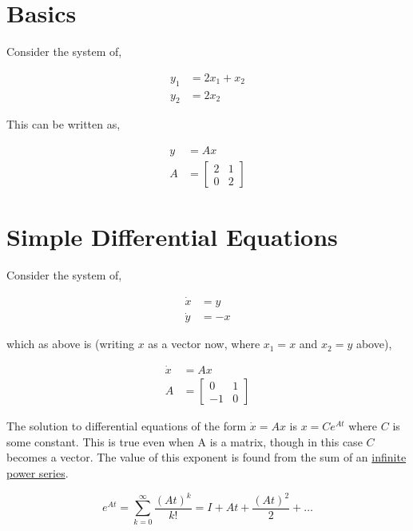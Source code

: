 \documentclass{article}
\begin{document}
\noindent{}

\section{Basics}

Consider the system of,

\begin{align}
    y_1 &= 2x_1 + x_2 \\
    y_2 &= 2x_2
\end{align}

\noindent This can be written as,

\begin{align}
    y &= Ax \\
    A &=
    \begin{bmatrix}
        2 & 1 \\
        0 & 2
    \end{bmatrix}
\end{align}

\section{Simple Differential Equations}

Consider the system of,

\begin{align}
    \dot{x} &= y \\
    \dot{y} &= -x
\end{align}

\noindent which as above is (writing $x$ as a vector now, where $x_1 = x$ and $x_2 = y$ above),

\begin{align}
    \dot{x} &= Ax \\
    A &=
    \begin{bmatrix}
        0 & 1 \\
        -1 & 0
    \end{bmatrix}
\end{align}

\noindent The solution to differential equations of the form $\dot{x} = Ax$ is $x = Ce^{At}$ where $C$ is some constant.
This is true even when A is a matrix, though in this case $C$ becomes a vector.
The value of this exponent is found from the sum of an \href{https://en.wikipedia.org/wiki/Matrix_exponential}{infinite power series}.

\begin{equation}
    e^{At} = \sum_{k=0}^{\infty} \frac{(At)^k}{k!} = I + At + \frac{(At)^2}{2} + \ldots{}
\end{equation}
\end{document}
